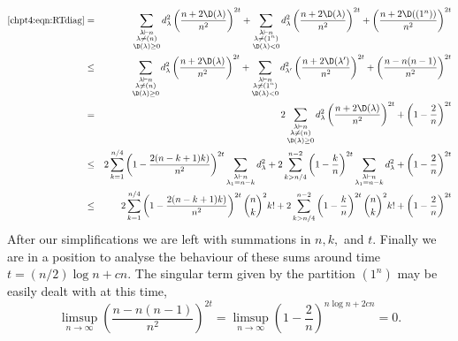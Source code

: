 \documentclass[11pt]{report}
\begin{document}
\begin{eqnarray}
\eqref{chpt4:eqn:RTdiag} & =   & \sum_{\substack{\lambda \vdash n \\\lambda \neq (n) \\ 
		\D(\lambda) \geq 
		0}} d_{\lambda}^{2}\left(\frac{n + 2\D(\lambda)}{n^{2}} \right)^{2t} + 
\sum_{\substack{\lambda \vdash n \\\lambda \neq (1^{n}) \\ \D(\lambda) < 
		0}} 
d_{\lambda}^{2}\left(\frac{n + 2\D(\lambda)}{n^{2}} \right)^{2t} + \left( 
\frac{n +2\D((1^{n}))}{n^{2}}\right)^{2t} \nonumber \\
& \leq  & \sum_{\substack{\lambda \vdash n \\\lambda \neq (n) \\ 
		\D(\lambda) \geq 0}} 
d_{\lambda}^{2}\left(\frac{n + 2\D(\lambda)}{n^{2}} \right)^{2t} + 
\sum_{\substack{\lambda \vdash n \\\lambda \neq (1^{n}) \\ \D(\lambda) < 0}}
d_{\lambda^{\prime}}^{2}\left(\frac{n + 2\D(\lambda^{\prime})}{n^{2}} 
\right)^{2t}  + \left( 
\frac{n -n(n-1)}{n^{2}} \right)^{2t} \nonumber\\
& = & 2\sum_{\substack{\lambda \vdash n \\\lambda \neq (n) \\ 
		\D(\lambda) \geq 0}} 
d_{\lambda}^{2}\left(\frac{n + 2\D(\lambda)}{n^{2}} \right)^{2t} + \left( 1 - \frac{2}{n}\right)^{2t} \label{chpt4:eqn:RTfirstsum} \\
& \leq & 2\sum_{k=1}^{n/4}\left( 1 - \frac{2(n-k+1)k)}{n^{2}} 
\right)^{2t} \sum_{\substack{\lambda \vdash n \\ \lambda_{1} =n-k}} 
d_{\lambda}^{2}+ 2\sum_{k>n/4}^{n-2}\left(1 - \frac{k}{n} 
\right)^{2t} 
\sum_{\substack{\lambda \vdash n \\ \lambda_{1} =n-k}} 
d_{\lambda}^{2}  + \left( 1 - \frac{2}{n}\right)^{2t} \nonumber\\
& \leq & 2\sum_{k=1}^{n/4}\left( 1 - \frac{2(n-k+1)k)}{n^{2}} 
\right)^{2t}{n \choose k}^{2} k!+ 2\sum_{k> n/4}^{n-2}\left(1 - \frac{k}{n} \right)^{2t} {n \choose k}^{2} 
k!   + \left( 1 - \frac{2}{n} \right)^{2t} \label{chpt4:eqn:RTbothsums}
\end{eqnarray}
After our simplifications we are left with summations in  
$n,k,$ and $t$. Finally we are in a position to analyse 
the behaviour of these sums around time $t = (n/2)\log n +cn$. The singular term given by the partition $(1^{n})$ may be easily dealt with at this time, 
\[\limsup_{n\to \infty} \left( \frac{n -n(n-1)}{n^{2}}\right)^{2t} 
=\limsup_{n\to 
	\infty} \left(1 - 
\frac{2}{n}\right)^{n\log n +2 cn} = 0.\]
\end{document}
